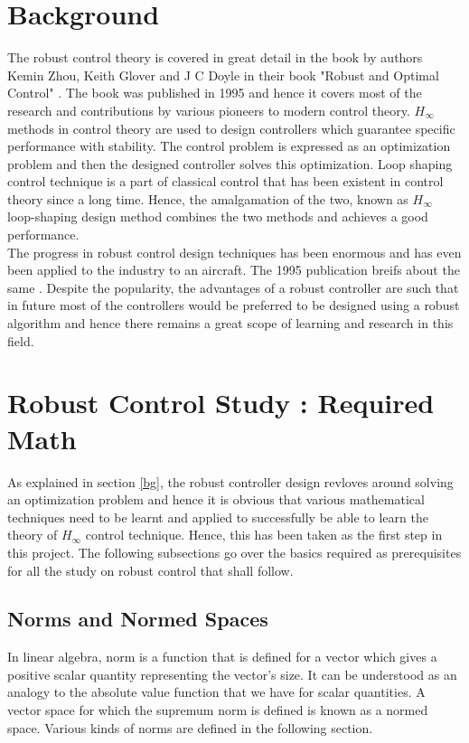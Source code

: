 \documentclass[a4paper,12pt]{article}
\begin{document}
\section{Background}
The robust control theory is covered in great detail in the book by authors Kemin Zhou, Keith Glover and J C Doyle in their book "Robust and Optimal Control" \cite{book}. The book was published in 1995 and hence it covers most of the research and contributions by various pioneers to modern control theory. $H_{\infty}$ methods in control theory are used to design controllers which guarantee specific performance with stability. The control problem is expressed as an optimization problem and then the designed controller solves this optimization. Loop shaping control technique is a part of classical control that has been existent in control theory since a long time. Hence, the amalgamation of the two, known as $H_{\infty}$ loop-shaping design method combines the two methods and achieves a good performance. \\
The progress in robust control design techniques has been enormous and has even been applied to the industry to an aircraft. The 1995 publication breifs about the same \cite{aero}. Despite the popularity, the advantages of a robust controller are such that in future most of the controllers would be preferred to be designed using a robust algorithm and hence there remains a great scope of learning and research in this field. \\
\label{bg}
\section{Robust Control Study : Required Math}

As explained in section \ref{bg}, the robust controller design revloves around solving an optimization problem and hence it is obvious that various mathematical techniques need to be learnt and applied to successfully be able to learn the theory of $H_{\infty}$ control technique. Hence, this has been taken as the first step in this project. The following subsections go over the basics required as prerequisites for all the study on robust control that shall follow.
	\subsection{Norms and Normed Spaces}
	In linear algebra, norm is a function that is defined for a vector which gives a positive scalar quantity representing the vector's size. It can be understood as an analogy to the absolute value function that we have for scalar quantities. A vector space for which the supremum norm is defined is known as a normed space. Various kinds of norms are defined in the following section.
\end{document}
